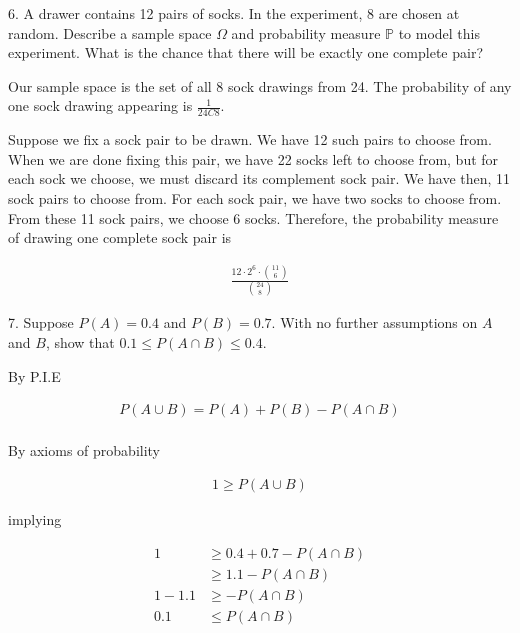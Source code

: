 \documentclass{article}
\begin{document}
\vspace{5mm}

6. A drawer contains 12 pairs of socks. In the experiment, 8 are chosen at random. Describe
a sample space $\Omega$ and probability measure $\mathbb{P}$ to model this experiment. What is the
chance that there will be exactly one complete pair?

\vspace{5mm}

Our sample space is the set of all 8 sock drawings from 24. The probability of any one sock drawing appearing
is $\frac{1}{24C8}$. 

\vspace{5mm}

Suppose we fix a sock pair to be drawn. We have 12 such pairs to choose from. When
we are done fixing this pair, we have 22 socks left to choose from, but for each sock we choose, we must
discard its complement sock pair. We have then, 11 sock pairs to choose from. For each sock pair, we have
two socks to choose from. From these 11 sock pairs, we choose 6 socks. 
Therefore, the probability measure of drawing one complete sock pair is

\begin{align*} 
    \frac{12\cdot2^{6}\cdot\binom{11}{6}}{\binom{24}{8}}
\end{align*}

\vspace{5mm}

7. Suppose $P(A) = 0.4$ and $P(B) = 0.7$. With no further assumptions on $A$ and $B$, show
that $0.1 \leq P(A \cap B) \leq 0.4$.

\vspace{5mm}

By P.I.E

\begin{align*}
    P(A \cup B) = P(A) + P(B) - P(A \cap B)\\
\end{align*}

By axioms of probability

\begin{align*}
    1 \geq P(A \cup B)
\end{align*}

implying

\begin{align*}
    1 &\geq 0.4 + 0.7 - P(A \cap B)\\
      &\geq 1.1 - P(A \cap B) \\
    1-1.1 &\geq -P(A \cap B) \\ 
    0.1 &\leq P(A \cap B)
\end{align*}
\end{document}
